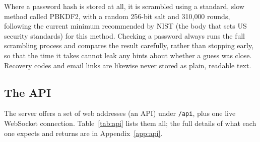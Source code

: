 Where a password hash is stored at all, it is scrambled using a standard,
slow method called PBKDF2, with a random 256-bit salt and 310{,}000
rounds, following the current minimum recommended by NIST (the body that
sets US security standards) for this method. Checking a password always
runs the full scrambling process and compares the result carefully, rather
than stopping early, so that the time it takes cannot leak any hints about
whether a guess was close. Recovery codes and email links are likewise
never stored as plain, readable text.

\subsection{The API}

The server offers a set of web addresses (an API) under \texttt{/api},
plus one live WebSocket connection. Table~\ref{tab:api} lists them all;
the full details of what each one expects and returns are in
Appendix~\ref{app:api}.

